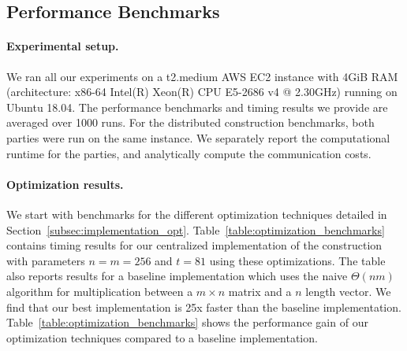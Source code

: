
\subsection{Performance Benchmarks}
\label{subsec:performance}
\paragraph{Experimental setup.}
We ran all our experiments on a t2.medium AWS EC2 instance with 4GiB RAM (architecture: x86-64 Intel(R) Xeon(R) CPU E5-2686 v4 @ 2.30GHz) running on Ubuntu 18.04. The performance benchmarks and timing results we provide are averaged over 1000 runs. For the distributed construction benchmarks, both parties were run on the same instance. We separately report the computational runtime for the parties, and analytically compute the communication costs. 


\paragraph{Optimization results.}
\iffull
We start with benchmarks for the different optimization techniques detailed in Section~\ref{subsec:implementation_opt}. Table~\ref{table:optimization_benchmarks} contains timing results for our centralized implementation of the \ttwPRF construction with parameters $n=m=256$ and $t=81$ using these optimizations. The table also reports results for a baseline implementation which uses the naive $\Theta(nm)$ algorithm for multiplication between a $m \times n$ matrix and a $n$ length vector. We find that our best implementation is 25x faster than the baseline implementation.
\else
Table~\ref{table:optimization_benchmarks} shows the performance gain of our optimization techniques compared to a baseline implementation.
\fi

